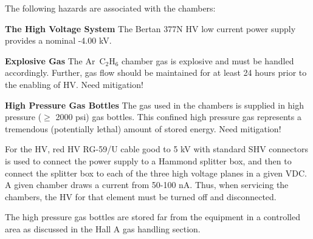 \begin{safetyen}{0}{0}

The following hazards are associated with the chambers:

\begin{description}
\item {\bf The High Voltage System}
The Bertan 377N HV low current power supply provides a nominal
-4.00 kV.
\item{\bf Explosive Gas} The Ar~C$_2$H$_6$ chamber gas is explosive
and must be handled accordingly.  Further, gas flow should be maintained
for at least 24 hours prior to the enabling of HV. Need mitigation!
\item{\bf High Pressure Gas Bottles} The gas used in the chambers
is supplied in high pressure ($\ge$ 2000 psi) gas bottles. This
confined high pressure gas represents a tremendous (potentially lethal)
amount of stored energy.  Need mitigation!
\end{description}



For the HV, red HV RG-59/U cable good to 5 kV with standard SHV
connectors is used to connect the power supply to a Hammond splitter
box, and then to connect the splitter box to each of the three high
voltage planes in a given VDC.  A given chamber draws a current
from  50-100 nA.  Thus, when servicing the chambers, the HV for that
element must be turned off and disconnected.

The high pressure gas bottles are stored far from the equipment in a controlled 
area as discussed in the Hall A gas handling section.



\end{safetyen}
